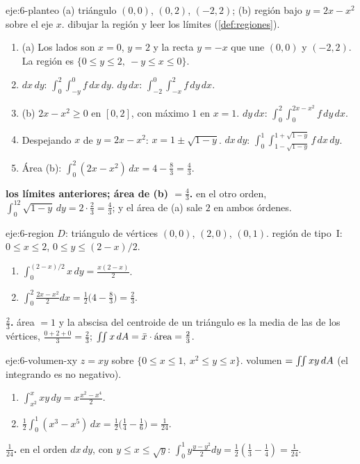 \begin{solucion}{eje:6-planteo}
\datos (a) triángulo $(0,0)$, $(0,2)$, $(-2,2)$; (b) región bajo $y=2x-x^2$ sobre el eje $x$.
\planteamiento dibujar la región y leer los límites (\cref{def:regiones}).
\pasos
\begin{enumerate}[label=\arabic*.]
  \item (a) Los lados son $x=0$, $y=2$ y la recta $y=-x$ que une $(0,0)$ y $(-2,2)$. La región es $\{0\le y\le2,\ -y\le x\le0\}$.
  \item $dx\,dy$: $\int_0^2\int_{-y}^{0}f\,dx\,dy$. $dy\,dx$: $\int_{-2}^{0}\int_{-x}^{2}f\,dy\,dx$.
  \item (b) $2x-x^2\ge0$ en $[0,2]$, con máximo $1$ en $x=1$. $dy\,dx$: $\int_0^2\int_0^{2x-x^2}f\,dy\,dx$.
  \item Despejando $x$ de $y=2x-x^2$: $x=1\pm\sqrt{1-y}$. $dx\,dy$: $\int_0^1\int_{1-\sqrt{1-y}}^{1+\sqrt{1-y}}f\,dx\,dy$.
  \item Área (b): $\int_0^2(2x-x^2)\,dx=4-\frac83=\frac43$.
\end{enumerate}
\resultado \textbf{los límites anteriores; área de (b) $=\frac43$.}
\comprobacion en el otro orden, $\int_0^12\sqrt{1-y}\,dy=2\cdot\frac23=\frac43$; y el área de (a) sale $2$ en ambos órdenes.
\end{solucion}

\begin{solucion}{eje:6-region}
\datos $D$: triángulo de vértices $(0,0)$, $(2,0)$, $(0,1)$.
\planteamiento región de tipo~I: $0\le x\le2$, $0\le y\le(2-x)/2$.
\pasos
\begin{enumerate}[label=\arabic*.]
  \item $\int_0^{(2-x)/2}x\,dy=\frac{x(2-x)}{2}$.
  \item $\int_0^2\frac{2x-x^2}{2}dx=\frac12\bigl(4-\frac83\bigr)=\frac23$.
\end{enumerate}
\resultado \textbf{$\frac23$.}
\comprobacion área $=1$ y la abscisa del centroide de un triángulo es la media de las de los vértices, $\frac{0+2+0}{3}=\frac23$; $\iint x\,dA=\bar x\cdot\text{área}=\frac23$.
\end{solucion}

\begin{solucion}{eje:6-volumen-xy}
\datos $z=xy$ sobre $\{0\le x\le1,\ x^2\le y\le x\}$.
\planteamiento volumen $=\iint xy\,dA$ (el integrando es no negativo).
\pasos
\begin{enumerate}[label=\arabic*.]
  \item $\int_{x^2}^{x}xy\,dy=x\frac{x^2-x^4}{2}$.
  \item $\frac12\int_0^1(x^3-x^5)\,dx=\frac12\bigl(\frac14-\frac16\bigr)=\frac1{24}$.
\end{enumerate}
\resultado \textbf{$\frac1{24}$.}
\comprobacion en el orden $dx\,dy$, con $y\le x\le\sqrt y$: $\int_0^1y\frac{y-y^2}{2}dy=\frac12(\frac13-\frac14)=\frac1{24}$.
\end{solucion}

